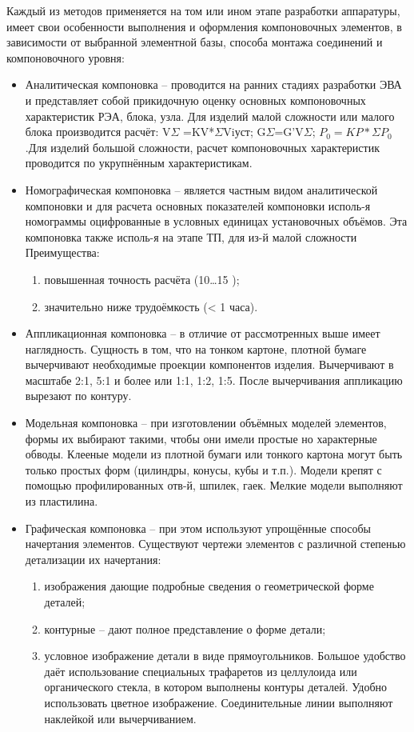 \documentclass[unicode, 12pt, a4paper, oneside]{article}
\begin{document}
Каждый из методов применяется на том или ином этапе разработки аппаратуры, имеет свои особенности выполнения и оформления компоновочных элементов, в зависимости от выбранной элементной базы, способа монтажа соединений и компоновочного уровня:
\begin{itemize}
\item Аналитическая компоновка – проводится на ранних стадиях разработки ЭВА и представляет собой прикидочную оценку основных компоновочных характеристик РЭА, блока, узла. Для изделий малой сложности или малого блока производится расчёт: V$\Sigma$ =KV*$\Sigma$Viуст; G$\Sigma$=G’V$\Sigma$; $P_0=KP*\Sigma P_0$.Для изделий большой сложности, расчет компоновочных характеристик проводится по укрупнённым характеристикам.
\item Номографическая компоновка – является частным видом аналитической компоновки и для расчета основных показателей компоновки исполь-я номограммы оцифрованные в условных единицах установочных объёмов. Эта компоновка также исполь-я на этапе ТП, для из-й малой сложности 
Преимущества:

\begin{enumerate} 
\item повышенная точность расчёта (10…15 \textdiscount ); 
\item значительно ниже трудоёмкость (< 1 часа). 
\end{enumerate}

\item Аппликационная компоновка – в отличие от рассмотренных выше имеет наглядность. Сущность в том, что на тонком картоне, плотной бумаге вычерчивают необходимые проекции компонентов изделия. Вычерчивают в масштабе 2:1, 5:1 и более или 1:1, 1:2, 1:5. После вычерчивания аппликацию вырезают по контуру.
\item Модельная компоновка – при изготовлении объёмных моделей элементов, формы их выбирают такими, чтобы они имели простые но характерные обводы. Клееные модели из плотной бумаги или тонкого картона могут быть только простых форм (цилиндры, конусы, кубы и т.п.). Модели крепят с помощью профилированных отв-й, шпилек, гаек. Мелкие модели выполняют из пластилина. 
\item Графическая компоновка – при этом используют упрощённые способы начертания элементов. Существуют чертежи элементов с различной степенью детализации их начертания:
\begin{enumerate} 
\item изображения дающие подробные сведения о геометрической форме деталей;
\item  контурные – дают полное представление о форме детали;
\item  условное изображение детали в виде прямоугольников. Большое удобство даёт использование специальных трафаретов из целлулоида или органического стекла, в котором выполнены контуры деталей. Удобно использовать цветное изображение. Соединительные линии выполняют наклейкой или вычерчиванием.
\end{enumerate}
 

\end{itemize}
\end{document}
